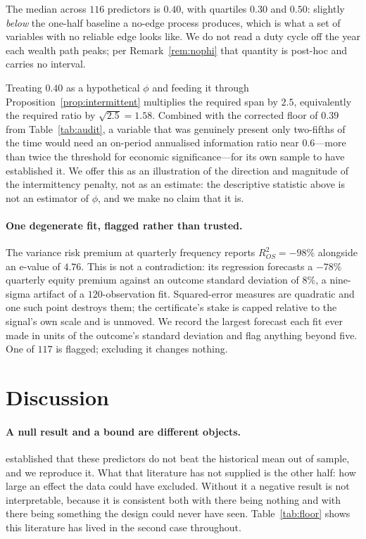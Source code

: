\documentclass{article}
\theoremstyle{plain}
\theoremstyle{definition}
\newcommand{\rsq}{R^2_{OS}}
\begin{document}
The median across $116$ predictors is $0.40$, with quartiles $0.30$ and $0.50$: slightly
\emph{below} the one-half baseline a no-edge process produces, which is what a set of variables
with no reliable edge looks like. We do not read a duty cycle off the year each wealth path
peaks; per Remark~\ref{rem:nophi} that quantity is post-hoc and carries no interval.

Treating $0.40$ as a hypothetical $\phi$ and feeding it through
Proposition~\ref{prop:intermittent} multiplies the required span by $2.5$, equivalently the
required ratio by $\sqrt{2.5}=1.58$. Combined with the corrected floor of $0.39$ from
Table~\ref{tab:audit}, a variable that was genuinely present only two-fifths of the time would
need an on-period annualised information ratio near $0.6$---more than twice the threshold for
economic significance---for its own sample to have established it. We offer this as an
illustration of the direction and magnitude of the intermittency penalty, not as an estimate:
the descriptive statistic above is not an estimator of $\phi$, and we make no claim that it
is.

\paragraph{One degenerate fit, flagged rather than trusted.} The variance risk premium at
quarterly frequency reports $\rsq=-98\%$ alongside an e-value of $4.76$. This is not a
contradiction: its regression forecasts a $-78\%$ quarterly equity premium against an outcome
standard deviation of $8\%$, a nine-sigma artifact of a $120$-observation fit. Squared-error
measures are quadratic and one such point destroys them; the certificate's stake is capped
relative to the signal's own scale and is unmoved. We record the largest forecast each fit
ever made in units of the outcome's standard deviation and flag anything beyond five. One of
$117$ is flagged; excluding it changes nothing.

\section{Discussion}

\paragraph{A null result and a bound are different objects.} \citet{welch2008} established
that these predictors do not beat the historical mean out of sample, and we reproduce it. What
that literature has not supplied is the other half: how large an effect the data could have
excluded. Without it a negative result is not interpretable, because it is consistent both
with there being nothing and with there being something the design could never have seen.
Table~\ref{tab:floor} shows this literature has lived in the second case throughout.
\end{document}
